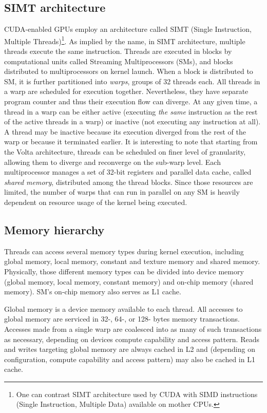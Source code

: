 \subsection{SIMT architecture}
CUDA-enabled GPUs employ an architecture called SIMT (Single Instruction, Multiple Threads)\footnote{One can contrast SIMT architecture used by CUDA with SIMD instructions (Single Instruction, Multiple  Data) available on mother CPUs.}. As implied by the name, in SIMT architecture, multiple threads execute the same instruction. Threads are executed in blocks  by computational units called Streaming Multiprocessors (SMs), and blocks distributed to multiprocessors on kernel launch. When a block is distributed to SM, it is further partitioned into \emph{warps}, groups of 32 threads each. All threads in a warp are scheduled for execution together. Nevertheless, they have separate program counter and thus their execution flow can diverge. At any given time, a  thread in a warp can be either active (executing \emph{the same} instruction as the rest of the active threads in a warp) or inactive (not executing any instruction at all). A thread may be inactive because its execution diverged from the rest of the warp or because it terminated earlier. It is interesting to note that starting from the Volta architecture, threads can be scheduled on finer level of granularity, allowing them to diverge and reconverge on the sub-warp level. Each multiprocessor manages a set of 32-bit registers and parallel data cache, called \emph{shared memory}, distributed among the thread blocks. Since those resources are limited, the number of warps that can run in parallel on any SM is heavily dependent on resource usage of the kernel being executed.

\subsection{Memory hierarchy}

Threads can access several memory types during kernel execution, including global memory, local memory, constant and texture memory and shared memory. Physically, those different memory types can be divided into device memory (global memory, local memory, constant memory) and on-chip memory (shared memory). SM's on-chip memory also serves as L1 cache.

Global memory is a device memory available to each thread. All accesses to global memory are serviced in 32-, 64-, or 128- bytes memory transactions. Accesses made from a single warp are coalesced into as many of such transactions as necessary, depending on devices compute capability and access pattern. Reads and writes targeting global memory are always cached in L2 and (depending on configuration, compute capability and access pattern) may also be cached in L1 cache.

